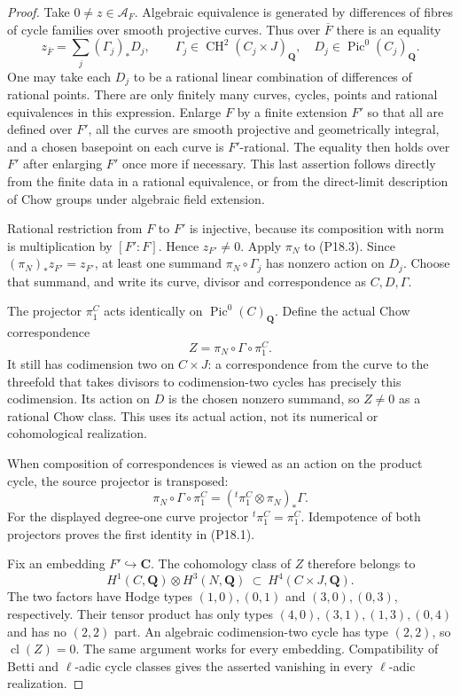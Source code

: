 \documentclass[11pt,a4paper]{article}
\begin{document}
\begin{proof}
Take $0\ne z\in\mathcal A_F$. Algebraic equivalence is generated
by differences of fibres of cycle families over smooth projective
curves. Thus over $\overline F$ there is an equality
\[
 z_{\overline F}=\sum_j(\Gamma_j)_*D_j,
 \qquad
 \Gamma_j\in\operatorname{CH}^2(C_j\times J)_{\mathbf Q},
 \quad D_j\in\operatorname{Pic}^0(C_j)_{\mathbf Q}.
                                                        \tag{P18.3}
\]
One may take each $D_j$ to be a rational linear combination of
differences of rational points. There are only finitely many
curves, cycles, points and rational equivalences in this
expression. Enlarge $F$ by a finite extension $F'$ so that all
are defined over $F'$, all the curves are smooth projective and
geometrically integral, and a chosen basepoint on each curve is
$F'$-rational. The equality then holds over $F'$ after enlarging
$F'$ once more if necessary. This last assertion follows directly
from the finite data in a rational equivalence, or from the
direct-limit description of Chow groups under algebraic field
extension.

Rational restriction from $F$ to $F'$ is injective, because its
composition with norm is multiplication by $[F':F]$.
Hence $z_{F'}\ne0$. Apply $\pi_N$ to (P18.3). Since
$(\pi_N)_*z_{F'}=z_{F'}$, at least one summand
$\pi_N\circ\Gamma_j$ has nonzero action on $D_j$. Choose that
summand, and write its curve, divisor and correspondence as
$C,D,\Gamma$.

The projector $\pi_1^C$ acts identically on
$\operatorname{Pic}^0(C)_{\mathbf Q}$. Define the actual Chow
correspondence
\[
              Z=\pi_N\circ\Gamma\circ\pi_1^C.
                                                        \tag{P18.4}
\]
It still has codimension two on $C\times J$: a correspondence
from the curve to the threefold that takes divisors to
codimension-two cycles has precisely this codimension.
Its action on $D$ is the chosen nonzero summand, so $Z\ne0$ as
a rational Chow class. This uses its actual action, not its
numerical or cohomological realization.

When composition of correspondences is viewed as an action on
the product cycle, the source projector is transposed:
\[
 \pi_N\circ\Gamma\circ\pi_1^C
       =({}^t\pi_1^C\otimes\pi_N)_*\Gamma.
\]
For the displayed degree-one curve projector
${}^t\pi_1^C=\pi_1^C$. Idempotence of both projectors proves
the first identity in (P18.1).

Fix an embedding $F'\hookrightarrow\mathbf C$. The cohomology
class of $Z$ therefore belongs to
\[
 H^1(C,\mathbf Q)\otimes H^3(N,\mathbf Q)
       \ \subset\ H^4(C\times J,\mathbf Q).
\]
The two factors have Hodge types $(1,0),(0,1)$ and
$(3,0),(0,3)$, respectively. Their tensor product has only types
$(4,0),(3,1),(1,3),(0,4)$ and has no $(2,2)$ part. An algebraic
codimension-two cycle has type $(2,2)$, so
$\operatorname{cl}(Z)=0$. The same argument works for every
embedding. Compatibility of Betti and $\ell$-adic cycle classes
gives the asserted vanishing in every $\ell$-adic realization.


\end{proof}
\end{document}
